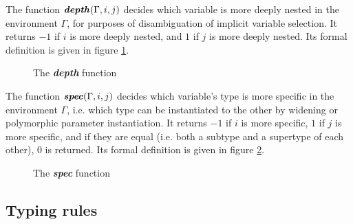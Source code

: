 The function $\textbf{\textit{depth}}(\Gamma, i, j)$ decides which variable is more deeply nested
in the environment $\Gamma$, for purposes of disambiguation of implicit variable
selection. It returns $-1$ if $i$ is more deeply nested, and $1$ if $j$ is more
deeply nested. Its formal definition is given in figure \ref{figure_depth}.
\begin{figure}[h]
    \vspace{-3mm}
    
    \caption{The \textbf{\textit{depth}} function}
    \label{figure_depth}
    \vspace{-3mm}
\end{figure}
The function $\textbf{\textit{spec}}(\Gamma, i, j)$ decides which variable's type is more
specific in the environment $\Gamma$, i.e. which type can be instantiated to the
other by widening or polymorphic parameter instantiation. It returns $-1$ if $i$
is more specific, $1$ if $j$ is more specific, and if they are equal (i.e. both
a subtype and a supertype of each other), 0 is returned. Its formal definition
is given in figure \ref{figure_spec}.
\begin{figure}[h]
    \vspace{-3mm}
    
    \caption{The \textbf{\textit{spec}} function}
    \label{figure_spec}
    \vspace{-3mm}
\end{figure}

\subsection{Typing rules}

